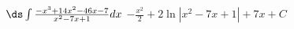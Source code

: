 {$\ds \int \frac{-x^3+14 x^2-46 x-7}{x^2-7 x+1} dx $}
{$-\frac{x^2}{2}+2 \ln \left|x^2-7 x+1\right|+7 x+C$}